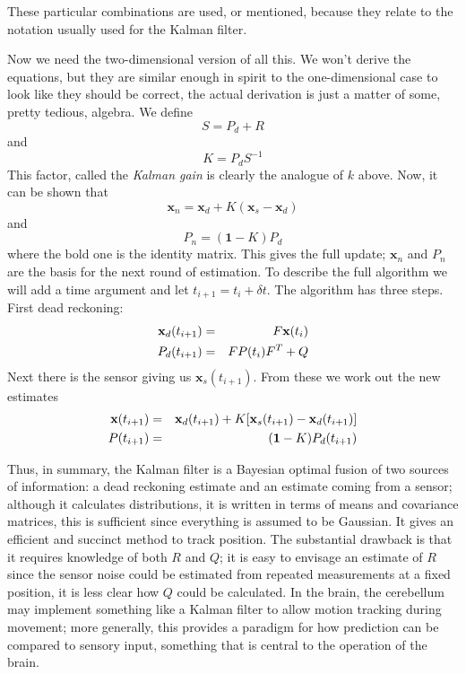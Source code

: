 \documentclass[12pt]{article}
\begin{document}
These particular combinations are used, or mentioned, because they relate to the
notation usually used for the Kalman filter.


Now we need the two-dimensional version of all this. We won't derive
the equations, but they are similar enough in spirit to the
one-dimensional case to look like they should be correct, the actual
derivation is just a matter of some, pretty tedious, algebra. We define
\begin{equation}
S=P_d+R
\end{equation}
and
\begin{equation}
K=P_dS^{-1}
\end{equation}
This factor, called the \textsl{Kalman gain} is clearly the analogue of $k$ above. Now, it can be shown that
\begin{equation}
\mathbf{x}_n=\mathbf{x}_d+K(\mathbf{x}_s-\mathbf{x}_d)
\end{equation}
and 
\begin{equation}
P_n=(\textbf{1}-K)P_d
\end{equation}
where the bold one is the identity matrix. This gives the full update;
$\mathbf{x}_n$ and $P_n$ are the basis for the next round of
estimation. To describe the full algorithm we will add a time argument
and let $t_{i+1}=t_i+\delta t$. The algorithm has three steps. First
dead reckoning:
\begin{eqnarray}
\textbf{x}_d(t_{i+1})&=&F\textbf{x}(t_i)\cr
P_d(t_{i+1})&=&FP(t_i)F^{T}+Q
\end{eqnarray}
Next there is the sensor giving us $\mathbf{x}_s(t_{i+1})$. From these we work out the new estimates
\begin{eqnarray}
\textbf{x}(t_{i+1})&=&\mathbf{x}_d(t_{i+1})+K[\mathbf{x}_s(t_{i+1})-\mathbf{x}_d(t_{i+1})]\cr
P(t_{i+1})&=&(\textbf{1}-K)P_d(t_{i+1})
\end{eqnarray}

Thus, in summary, the Kalman filter is a Bayesian optimal fusion of
two sources of information: a dead reckoning estimate and an estimate
coming from a sensor; although it calculates distributions, it is
written in terms of means and covariance matrices, this is sufficient
since everything is assumed to be Gaussian. It gives an efficient and
succinct method to track position. The substantial drawback is that it
requires knowledge of both $R$ and $Q$; it is easy to envisage an
estimate of $R$ since the sensor noise could be estimated from
repeated measurements at a fixed position, it is less clear how $Q$
could be calculated. In the brain, the cerebellum may implement something like a Kalman filter to allow motion tracking during movement; more generally, this provides a paradigm for how prediction can be compared to sensory input, something that is central to the operation of the brain.


{}
\end{document}
